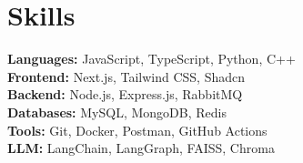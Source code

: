 \section*{Skills}

\textbf{Languages:} JavaScript, TypeScript, Python, C++ \\[0.1cm]
\textbf{Frontend:} Next.js, Tailwind CSS, Shadcn \\[0.1cm]
\textbf{Backend:} Node.js, Express.js, RabbitMQ \\[0.1cm]
\textbf{Databases:} MySQL, MongoDB, Redis \\[0.1cm]
\textbf{Tools:} Git, Docker, Postman, GitHub Actions \\[0.1cm]
\textbf{LLM:} LangChain, LangGraph, FAISS, Chroma